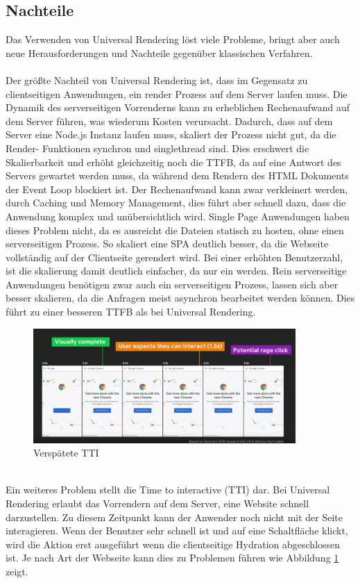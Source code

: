 \documentclass[runningheads]{llncs}
\numberwithin{figure}{section}
\begin{document}
\subsection{Nachteile}
\label{subsec:Nachteile}
Das Verwenden von Universal Rendering löst viele Probleme, 
bringt aber auch neue Herausforderungen und 
Nachteile gegenüber klassischen Verfahren.
\\
\\
Der größte Nachteil von Universal Rendering ist, 
dass im Gegensatz zu clientseitigen Anwendungen, 
ein render Prozess auf dem Server laufen muss. 
Die Dynamik des serverseitigen Vorrenderns 
kann zu erheblichen Rechenaufwand auf dem Server führen, 
was wiederum Kosten verursacht. 
Dadurch, dass auf dem Server eine Node.js Instanz laufen muss, 
skaliert der Prozess nicht gut, 
da die Render- Funktionen synchron und singlethread sind. 
Dies erschwert die Skalierbarkeit und erhöht gleichzeitig noch die TTFB, 
da auf eine Antwort des Servers gewartet werden muss, 
da während dem Rendern des HTML Dokuments der Event Loop blockiert ist. 
Der Rechenaufwand kann zwar verkleinert werden, 
durch Caching und Memory Management, 
dies führt aber schnell dazu, 
dass die Anwendung komplex und unübersichtlich wird. 
Single Page Anwendungen haben dieses Problem nicht, 
da es ausreicht die Dateien statisch zu hosten, 
ohne einen serverseitigen Prozess. 
So skaliert eine SPA deutlich besser, 
da die Webseite vollständig auf der Clientseite gerendert wird.  
Bei einer erhöhten Benutzerzahl, 
ist die skalierung damit deutlich einfacher, 
da nur ein werden. 
Rein serverseitige Anwendungen benötigen zwar auch ein serverseitigen Prozess, 
lassen sich aber besser skalieren, 
da die Anfragen meist asynchron bearbeitet werden können. 
Dies führt zu einer besseren TTFB als bei Universal Rendering.
\begin{figure}[h]
  \centering
  \includegraphics[width=10cm]{images/TimeToInteractive}
  \caption{Verspätete TTI \cite{osmani_2019}}
  \label{Verspätete TTI}
\end{figure}
\\
Ein weiteres Problem stellt die Time to interactive (TTI) dar. 
Bei Universal Rendering erlaubt das Vorrendern auf dem Server, 
eine Website schnell darzustellen. 
Zu diesem Zeitpunkt kann der Anwender noch nicht mit der Seite interagieren. 
Wenn der Benutzer sehr schnell ist und auf eine Schaltfläche klickt, 
wird die Aktion erst ausgeführt wenn die clientseitige Hydration abgeschlossen ist. 
Je nach Art der Webseite kann dies zu Problemen führen wie Abbildung \ref{Verspätete TTI} zeigt.
\end{document}
